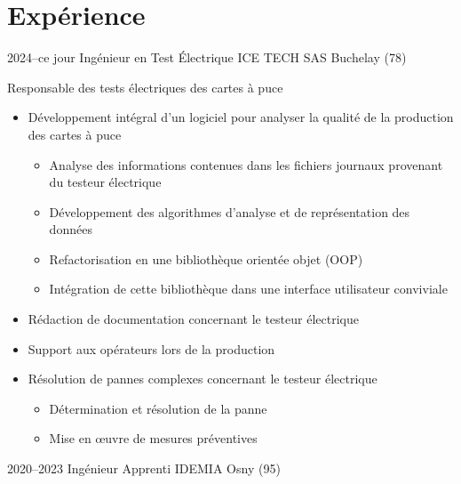 \documentclass[11pt,a4paper]{moderncv}
\begin{document}
\section{Expérience}
\cventry
    {2024--ce jour}
    {Ingénieur en Test Électrique}
    {ICE TECH SAS}
    {Buchelay (78)}
    {}
    {
    Responsable des tests électriques des cartes à puce 
    \begin{itemize}
        \setlength{\itemindent}{1cm}
        \item Développement intégral d'un logiciel pour analyser la qualité de la production des cartes à puce
        \begin{itemize}
            \setlength{\itemindent}{1.5cm}
            \item Analyse des informations contenues dans les fichiers journaux provenant du testeur électrique
            \item Développement des algorithmes d'analyse et de représentation des données
            \item Refactorisation en une bibliothèque orientée objet (OOP)
            \item Intégration de cette bibliothèque dans une interface utilisateur conviviale
        \end{itemize}
        \item Rédaction de documentation concernant le testeur électrique
        \item Support aux opérateurs lors de la production
        \item Résolution de pannes complexes concernant le testeur électrique
        \begin{itemize}
            \setlength{\itemindent}{1.5cm}
            \item Détermination et résolution de la panne
            \item Mise en œuvre de mesures préventives
        \end{itemize}
    \end{itemize}
    }
\cventry
    {2020--2023}
    {Ingénieur Apprenti}
    {IDEMIA}
    {Osny (95)}
    {}
\end{document}
